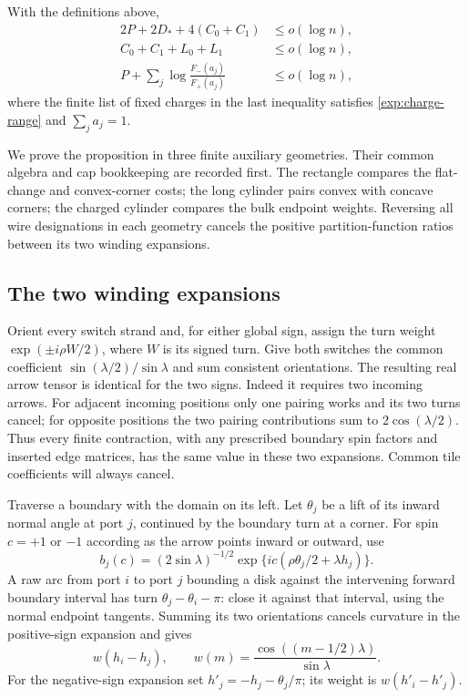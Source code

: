 \begin{proposition}\label{exp:comparisons}
With the definitions above,
\begin{align}
 2P+2D_*+4(C_0+C_1)&\le o(\log n),\label{exp:rectangle-budget}\\
 C_0+C_1+L_0+L_1&\le o(\log n),\label{exp:corner-budget}\\
 P+\sum_j\log\frac{F_-(a_j)}{F_+(a_j)}
   &\le o(\log n),\label{exp:charge-budget}
\end{align}
where the finite list of fixed charges in the last inequality satisfies
\eqref{exp:charge-range} and $\sum_j a_j=1$.
\end{proposition}

We prove the proposition in three finite auxiliary geometries. Their
common algebra and cap bookkeeping are recorded first. The rectangle
compares the flat-change and convex-corner costs; the long cylinder
pairs convex with concave corners; the charged cylinder compares the
bulk endpoint weights. Reversing all wire designations in each geometry
cancels the positive partition-function ratios between its two winding
expansions.

\subsection{The two winding expansions}

Orient every switch strand and, for either global sign, assign the turn
weight $\exp(\pm i\rho W/2)$, where $W$ is its signed turn. Give both
switches the common coefficient $\sin(\lambda/2)/\sin\lambda$ and sum
consistent orientations. The resulting real arrow tensor is identical
for the two signs. Indeed it requires two incoming arrows. For adjacent
incoming positions only one pairing works and its two turns cancel;
for opposite positions the two pairing contributions sum to
$2\cos(\lambda/2)$. Thus every finite contraction, with any prescribed
boundary spin factors and inserted edge matrices, has the same value
in these two expansions. Common tile coefficients will always cancel.

Traverse a boundary with the domain on its left. Let $\theta_j$ be a
lift of its inward normal angle at port $j$, continued by the boundary
turn at a corner. For spin $c=+1$ or $-1$ according as the arrow points
inward or outward, use
\begin{equation}\label{exp:boundary-spin}
 b_j(c)=(2\sin\lambda)^{-1/2}
          \exp\{ic(\rho\theta_j/2+\lambda h_j)\}.
\end{equation}
A raw arc from port $i$ to port $j$ bounding a disk against the
intervening forward boundary interval has turn
$\theta_j-\theta_i-\pi$: close it against that interval, using the
normal endpoint tangents. Summing its two orientations cancels curvature
in the positive-sign expansion and gives
\begin{equation}\label{exp:arc-weight}
 w(h_i-h_j),\qquad
 w(m)=\frac{\cos((m-1/2)\lambda)}{\sin\lambda}.
\end{equation}
For the negative-sign expansion set $h'_j=-h_j-\theta_j/\pi$;
its weight is $w(h'_i-h'_j)$.

